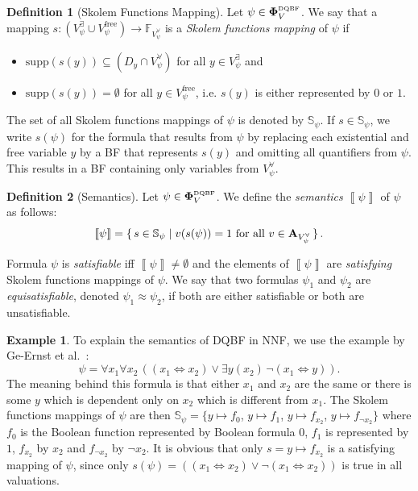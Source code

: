 \documentclass[
  digital, %
  color,
  twoside, %
  table,   %
  nolof,     %
  nolot,     %
]{fithesis3}
\let\setbuilder\set
\newcommand{\simpleset}[1]{\{{#1}\}}
\renewcommand{\set}[1]{\normalexpandarg\IfSubStr{#1}{|}{\setbuilder{#1}}{\simpleset{#1}}}
\theoremstyle{definition}
\newtheorem{definition}{Definition}
\newtheorem{example}{Example}
\theoremstyle{remark}
\newcommand{\seman}[1]{\left\llbracket {#1} \right\rrbracket}
\newcommand{\DQBF}[1]{\mathbf{\Phi}_{#1}^{\normalfont{\text{\tiny DQBF}}}}
\newcommand{\valtns}[1]{\mathbf{A}_{#1}}
\newcommand{\BFuncs}[1]{\mathbb{F}_{#1}}
\newcommand{\evars}[1]{V_{#1}^{\exists}}
\newcommand{\uvars}[1]{V_{#1}^{\forall}}
\newcommand{\fvars}[1]{V_{#1}^{\mathrm{free}}}
\newcommand{\supp}[1]{\mathrm{supp}(#1)}
\newcommand{\Scands}[1]{\mathbb{S}_{#1}}
\newcommand{\lequal}{\Leftrightarrow}
\newcommand{\itholds}{\,}
\begin{document}
\begin{definition}[Skolem Functions Mapping]
  Let $\psi \in \DQBF{V}$. We say that a mapping $s\colon (\evars{\psi} \cup \fvars{\psi}) \to \BFuncs{\uvars{\psi}}$ is a \emph{Skolem functions mapping} of $\psi$ if
  \begin{itemize}
      \item $\supp{s(y)} \subseteq (D_y \cap \uvars{\psi})$ for all $y \in \evars{\psi}$ and
      \item $\supp{s(y)} = \emptyset$ for all $y \in \fvars{\psi}$, i.e. $s(y)$ is either represented by $0$ or $1$.
  \end{itemize}
\end{definition}

The set of all Skolem functions mappings of $\psi$ is denoted by $\Scands{\psi}$. If $s \in \Scands{\psi}$, we write $s(\psi)$ for the formula that results from $\psi$ by replacing each existential and free variable $y$ by a BF that represents $s(y)$ and omitting all quantifiers from $\psi$. This results in a BF containing only variables from $\uvars{\psi}$.

\begin{definition}[Semantics]
  Let $\psi \in \DQBF{V}$. We define the \emph{semantics} $\seman{\psi}$ of $\psi$ as follows:
  \[\seman{\psi} = \set{s \in \Scands{\psi} | v(s(\psi))=1 \text{ for all } v \in \valtns{\uvars{\psi}}}.\]
\end{definition}
Formula $\psi$ is \emph{satisfiable} iff $\seman{\psi} \not= \emptyset$ and the elements of $\seman{\psi}$ are \emph{satisfying} Skolem functions mappings of $\psi$. We say that two formulas $\psi_1$ and $\psi_2$ are \emph{equisatisfiable}, denoted $\psi_1 \approx \psi_2$, if both are either satisfiable or both are unsatisfiable.
\begin{example}
\label{ex:DQBF:NNF}
To explain the semantics of DQBF in NNF, we use the example by Ge-Ernst et al.~\cite{HQSquantifierLocalisation}:
\[\psi = \forall x_1 \forall x_2\itholds ((x_1 \lequal x_2) \lor \exists y (x_2)\itholds \neg(x_1 \lequal y)).\]
The meaning behind this formula is that either $x_1$ and $x_2$ are the same or there is some $y$ which is dependent only on $x_2$ which is different from $x_1$. The Skolem functions mappings of $\psi$ are then $\Scands{\psi} = \{y\mapsto f_0$, $y\mapsto f_1$, $y\mapsto f_{x_2}$, $y\mapsto f_{\neg x_2}\}$ where $f_0$ is the Boolean function represented by Boolean formula $0$, $f_1$ is represented by $1$, $f_{x_2}$ by $x_2$ and $f_{\neg x_2}$ by $\neg x_2$. It is obvious that only $s = y \mapsto f_{x_2}$ is a satisfying mapping of $\psi$, since only $s(\psi) = ((x_1 \lequal x_2) \lor \neg(x_1 \lequal x_2))$ is true in all valuations.
\end{example}
\end{document}
